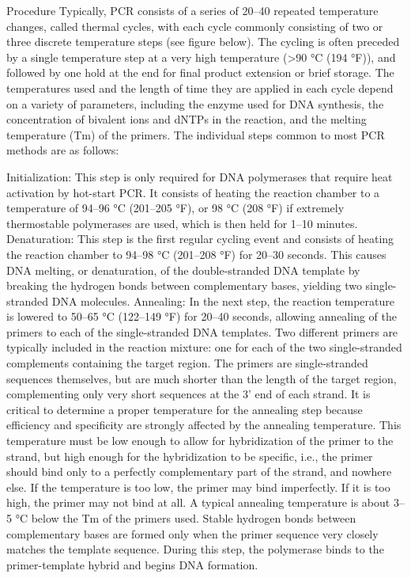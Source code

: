 Procedure
Typically, PCR consists of a series of 20--40 repeated temperature changes, called thermal cycles, with each cycle commonly consisting of two or three discrete temperature steps (see figure below). The cycling is often preceded by a single temperature step at a very high temperature (\textgreater{}90 °C (194 °F)), and followed by one hold at the end for final product extension or brief storage. The temperatures used and the length of time they are applied in each cycle depend on a variety of parameters, including the enzyme used for DNA synthesis, the concentration of bivalent ions and dNTPs in the reaction, and the melting temperature (Tm) of the primers. The individual steps common to most PCR methods are as follows:

Initialization: This step is only required for DNA polymerases that require heat activation by hot-start PCR. It consists of heating the reaction chamber to a temperature of 94--96 °C (201--205 °F), or 98 °C (208 °F) if extremely thermostable polymerases are used, which is then held for 1--10 minutes.
Denaturation: This step is the first regular cycling event and consists of heating the reaction chamber to 94--98 °C (201--208 °F) for 20--30 seconds. This causes DNA melting, or denaturation, of the double-stranded DNA template by breaking the hydrogen bonds between complementary bases, yielding two single-stranded DNA molecules.
Annealing: In the next step, the reaction temperature is lowered to 50--65 °C (122--149 °F) for 20--40 seconds, allowing annealing of the primers to each of the single-stranded DNA templates. Two different primers are typically included in the reaction mixture: one for each of the two single-stranded complements containing the target region. The primers are single-stranded sequences themselves, but are much shorter than the length of the target region, complementing only very short sequences at the 3' end of each strand.
It is critical to determine a proper temperature for the annealing step because efficiency and specificity are strongly affected by the annealing temperature. This temperature must be low enough to allow for hybridization of the primer to the strand, but high enough for the hybridization to be specific, i.e., the primer should bind only to a perfectly complementary part of the strand, and nowhere else. If the temperature is too low, the primer may bind imperfectly. If it is too high, the primer may not bind at all. A typical annealing temperature is about 3--5 °C below the Tm of the primers used. Stable hydrogen bonds between complementary bases are formed only when the primer sequence very closely matches the template sequence. During this step, the polymerase binds to the primer-template hybrid and begins DNA formation.
